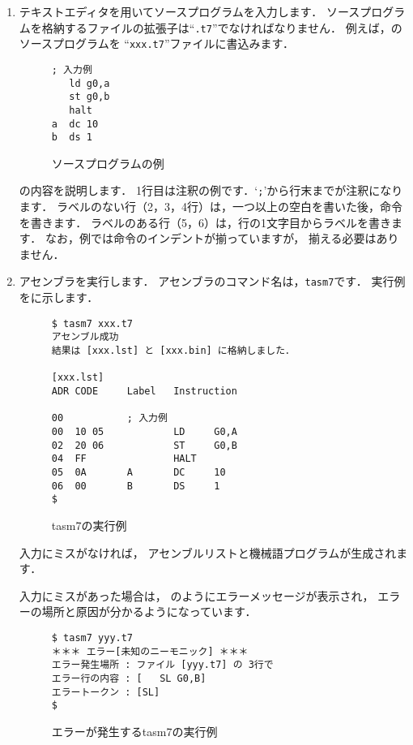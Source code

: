 \begin{enumerate}
\item テキストエディタを用いてソースプログラムを入力します．
ソースプログラムを格納するファイルの拡張子は``{\tt .t7}''でなければなりません．
例えば，のソースプログラムを
``{\tt xxx.t7}''ファイルに書込みます．

\begin{figure}[bt]
{\small\begin{lstlisting}[xleftmargin=5mm]
; 入力例
   ld g0,a
   st g0,b
   halt
a  dc 10
b  ds 1
\end{lstlisting}}
\caption{ソースプログラムの例}
\label{fig:chap6:source}
\end{figure}

の内容を説明します．
1行目は注釈の例です．`{\tt ;}'から行末までが注釈になります．
ラベルのない行（2，3，4行）は，一つ以上の空白を書いた後，命令を書きます．
ラベルのある行（5，6）は，行の1文字目からラベルを書きます．
なお，例では命令のインデントが揃っていますが，
揃える必要はありません．

\item アセンブラを実行します．
アセンブラのコマンド名は，{\tt tasm7}です．
実行例をに示します．

\begin{figure}[bt]
{\small\begin{lstlisting}[numbers=none]
$ tasm7 xxx.t7
アセンブル成功
結果は [xxx.lst] と [xxx.bin] に格納しました．

[xxx.lst]
ADR CODE     Label   Instruction

00           ; 入力例
00  10 05            LD     G0,A
02  20 06            ST     G0,B
04  FF               HALT
05  0A       A       DC     10
06  00       B       DS     1
$
\end{lstlisting}}
\caption{tasm7の実行例}
\label{fig:chap6:tasm7}
\end{figure}

入力にミスがなければ，
アセンブルリストと機械語プログラムが生成されます．

入力にミスがあった場合は，
のようにエラーメッセージが表示され，
エラーの場所と原因が分かるようになっています．

\begin{figure}[bt]
{\small\begin{lstlisting}[numbers=none]
$ tasm7 yyy.t7
＊＊＊ エラー[未知のニーモニック] ＊＊＊
エラー発生場所 : ファイル [yyy.t7] の 3行で
エラー行の内容 : [   SL G0,B]
エラートークン : [SL]
$
\end{lstlisting}}
\caption{エラーが発生するtasm7の実行例}
\label{fig:chap6:error}
\end{figure}
\end{enumerate}

